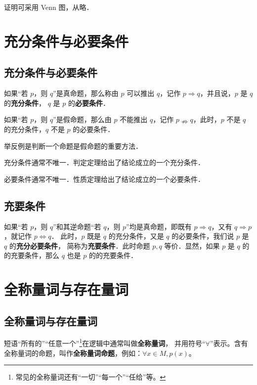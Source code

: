 \documentclass[a4paper,openany]{ctexbook}
\begin{document}
证明可采用 Venn 图，从略．

\section{充分条件与必要条件}

\subsection{充分条件与必要条件}

如果“若 \(p\)，则 \(q\)”是真命题，那么称由 \(p\) 可以推出 \(q\)，记作 \(p\Rightarrow q\)，并且说，\(p\) 是 \(q\) 的\textbf{充分条件}，
\(q\) 是 \(p\) 的\textbf{必要条件}．

如果“若 \(p\)，则 \(q\)”是假命题，那么由 \(p\) 不能推出 \(q\)，记作 \(p\nRightarrow q\)，此时，\(p\) 不是 \(q\) 的充分条件，\(q\) 不是 \(p\) 的必要条件．

举反例是判断一个命题是假命题的重要方法．

充分条件通常不唯一．判定定理给出了结论成立的一个充分条件．

必要条件通常不唯一．性质定理给出了结论成立的一个必要条件．

\subsection{充要条件}

如果“若 \(p\)，则 \(q\)”和其逆命题“若 \(q\)，则 \(p\)”均是真命题，即既有 \(p\Rightarrow q\)，又有 \(q\Rightarrow p\)，就记作 \(p \Leftrightarrow q\)．
此时，\(p\) 既是 \(q\) 的充分条件，又是 \(q\) 的必要条件，我们说 \(p\) 是 \(q\) 的\textbf{充分必要条件}，
简称为\textbf{充要条件}．此时命题 \(p,q\) 等价．显然，如果 \(p\) 是 \(q\) 的的充要条件，那么 \(q\) 也是 \(p\) 的的充要条件．

\section{全称量词与存在量词}

\subsection{全称量词与存在量词}

短语“所有的”“任意一个”\footnote{常见的全称量词还有“一切”“每一个”“任给”等。}在逻辑中通常叫做\textbf{全称量词}，
并用符号“\(\forall\)”表示。含有全称量词的命题，叫作\textbf{全称量词命题}，例如：\(\forall x \in M, p(x)\)。
\end{document}
